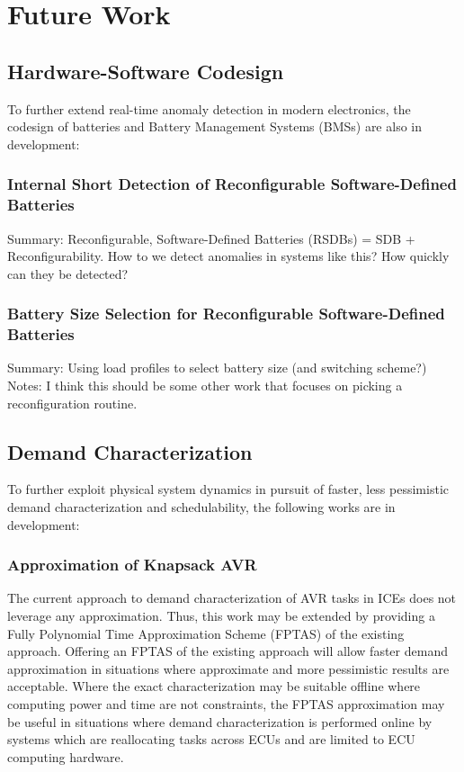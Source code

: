 \section{Future Work} \label{chap:futureWork}

\subsection{Hardware-Software Codesign}

To further extend real-time anomaly detection in modern electronics, the codesign of batteries and Battery Management Systems (BMSs) are also in development:

\subsubsection{Internal Short Detection of Reconfigurable Software-Defined Batteries}

Summary: Reconfigurable, Software-Defined Batteries (RSDBs) = SDB + Reconfigurability. How to we detect anomalies in systems like this? How quickly can they be detected?

\subsubsection{Battery Size Selection for Reconfigurable Software-Defined Batteries}

Summary: Using load profiles to select battery size (and switching scheme?)
Notes: I think this should be some other work that focuses on picking a reconfiguration routine.

\subsection{Demand Characterization}

To further exploit physical system dynamics in pursuit of faster, less pessimistic demand characterization and schedulability, the following works are in development:

\subsubsection{Approximation of Knapsack AVR}

The current approach to demand characterization of AVR tasks in ICEs does not leverage any approximation.
Thus, this work may be extended by providing a Fully Polynomial Time Approximation Scheme (FPTAS) of the existing approach.
Offering an FPTAS of the existing approach will allow faster demand approximation in situations where approximate and more pessimistic results are acceptable.
Where the exact characterization may be suitable offline where computing power and time are not constraints, the FPTAS approximation may be useful in situations where demand characterization is performed online by systems which are reallocating tasks across ECUs and are limited to ECU computing hardware.

